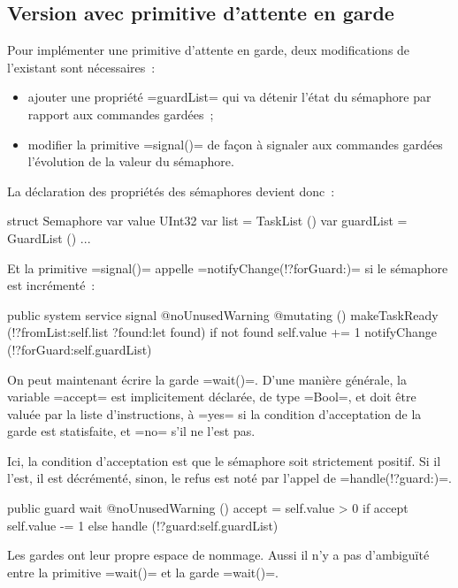 \subsection{Version avec primitive d'attente en garde}

Pour implémenter une primitive d'attente en garde, deux modifications de l'existant sont nécessaires~:
\begin{itemize}
  \item ajouter une propriété \plm=guardList= qui va détenir l'état du sémaphore par rapport aux commandes gardées~;
  \item modifier la primitive \plm=signal()= de façon à signaler aux commandes gardées l'évolution de la valeur du sémaphore.
\end{itemize}

La déclaration des propriétés des sémaphores devient donc~:

\begin{PLM}
struct Semaphore {
  var value UInt32
  var list = TaskList ()
  var guardList = GuardList ()
  ...
}
\end{PLM}

Et la primitive \plm=signal()= appelle \plm=notifyChange(!?forGuard:)= si le sémaphore est incrémenté~:

\begin{PLM}
  public system service signal @noUnusedWarning @mutating () {
    makeTaskReady (!?fromList:self.list ?found:let found)
    if not found {
      self.value += 1
      notifyChange (!?forGuard:self.guardList)
    }
  }
\end{PLM}

On peut maintenant écrire la garde \plm=wait()=. D'une manière générale, la variable \plm=accept= est implicitement déclarée, de type \plm=Bool=, et doit être valuée par la liste d'instructions, à \plm=yes= si la condition d'acceptation de la garde est statisfaite, et \plm=no= s'il ne l'est pas.

Ici, la condition d'acceptation est que le sémaphore soit strictement positif. Si il l'est, il est décrémenté, sinon, le refus est noté par l'appel de \plm=handle(!?guard:)=.

\begin{PLM}
public guard wait @noUnusedWarning () {
  accept = self.value > 0
  if accept {
    self.value -= 1
  }else{
    handle (!?guard:self.guardList)
  }
}
\end{PLM}


Les gardes ont leur propre espace de nommage. Aussi il n'y a pas d'ambiguïté entre la primitive \plm=wait()= et la garde \plm=wait()=.













